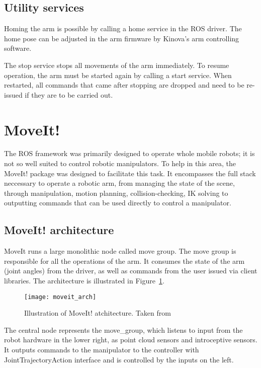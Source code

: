 \documentclass[buriama8_dp.tex]{subfiles}
\begin{document}
\subsection{Utility services}
\label{subsec:api_util}

Homing the arm is possible by calling a home service in the ROS driver. The home pose can be adjusted in the arm firmware by Kinova's arm controlling software.

The stop service stops all movements of the arm immediately. To resume operation, the arm must be started again by calling a start service. When restarted, all commands that came after stopping are dropped and need to be re-issued if they are to be carried out.


\section{MoveIt!}
\label{sec:moveit}

The ROS framework was primarily designed to operate whole mobile robots; it is not so well suited to control robotic manipulators. To help in this area, the MoveIt! package was designed to facilitate this task. It encompasses the full stack neccessary to operate a robotic arm, from managing the state of the scene, through manipulation, motion planning, collision-checking, IK solving to outputting commands that can be used directly to control a manipulator.

\subsection{MoveIt! architecture}
\label{subsec:mvt_arch}

MoveIt runs a large monolithic node called move group. The move group is responsible for all the operations of the arm. It consumes the state of the arm (joint angles) from the driver, as well as commands from the user issued via client libraries. The architecture is illustrated in Figure~\ref{fig:moveit_arch}.

\begin{figure}[ht]
  \centering
  \texttt{[image: moveit\_arch]}
  \caption[MoveIt! architecture]{Illustration of MoveIt! atchitecture. Taken from \cite{moveit_docs}}
  \label{fig:moveit_arch}
\end{figure}

The central node represents the move\_group, which listens to input from the robot hardware in the lower right, as point cloud sensors and introceptive sensors. It outputs commands to the manipulator to the controller with JointTrajectoryAction interface and is controlled by the inputs on the left. 
\end{document}

